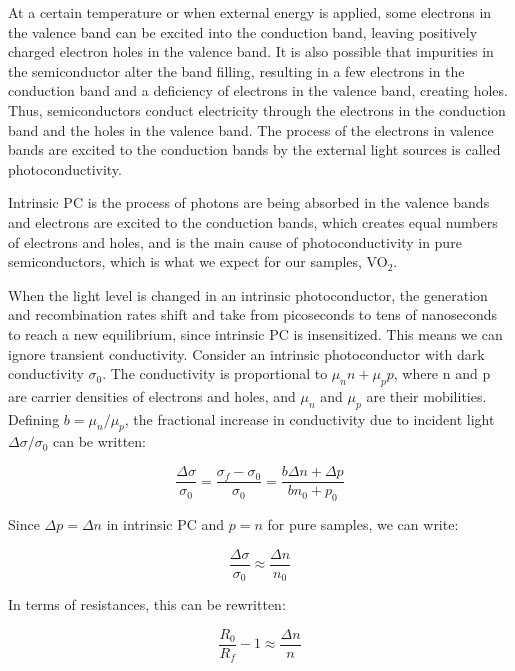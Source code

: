 \documentclass{article}
\begin{document}
At a certain temperature or when external energy is applied, some electrons in the valence band can be excited into the conduction band, leaving positively charged electron holes in the valence band. It is also possible that impurities in the semiconductor alter the band filling, resulting in a few electrons in the conduction band and a deficiency of electrons in the valence band, creating holes. Thus, semiconductors conduct electricity through the electrons in the conduction band and the holes in the valence band. The process of the electrons in valence bands are excited to the conduction bands by the external light sources is called photoconductivity. 


Intrinsic PC is the process of photons are being absorbed in the valence bands and electrons are excited to the conduction bands, which creates equal numbers of electrons and holes, and is the main cause of photoconductivity in pure semiconductors, which is what we expect for our samples, VO$_{2}$.

When the light level is changed in an intrinsic photoconductor, the generation and recombination rates shift and take from picoseconds to tens of nanoseconds to reach a new equilibrium, since intrinsic PC is insensitized. This means we can ignore transient conductivity. Consider an intrinsic photoconductor with dark conductivity $\sigma_0$. The conductivity is proportional to $\mu_nn+\mu_pp$, where n and p are carrier densities of electrons and holes, and $\mu_n$ and $\mu_p$ are their mobilities. Defining $b=\mu_n/\mu_p$, the fractional increase in conductivity due to incident light $\Delta \sigma/\sigma_0$ can be written:

\begin{equation}
    \frac{\Delta \sigma}{\sigma_0} = \frac{\sigma_f-\sigma_0}{\sigma_0} = \frac{b\Delta n+\Delta p}{bn_0+p_0}
\end{equation}

Since $\Delta p = \Delta n$ in intrinsic PC and $p=n$ for pure samples, we can write:

\begin{equation}
    \frac{\Delta \sigma}{\sigma_0} \approx \frac{\Delta n}{n_0}
\end{equation}

In terms of resistances, this can be rewritten:

\begin{equation}
    \frac{R_0}{R_f}-1\approx\frac{\Delta n}{n}
\end{equation}
\end{document}
